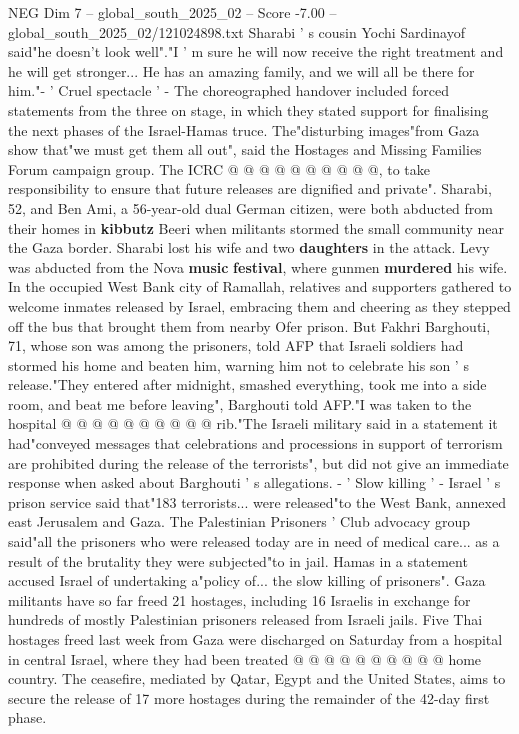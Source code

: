 \begin{textsample}{NEG Dim 7 – global\_south\_2025\_02 – Score -7.00 – global\_south\_2025\_02/121024898.txt}
Sharabi ' s cousin Yochi Sardinayof said"he doesn't look well"."I ' m sure he will now receive the right treatment and he will get stronger...
He has an amazing family, and we will all be there for him."- ' Cruel spectacle ' - The choreographed handover included forced statements from the three on stage, in which they stated support for finalising the next phases of the Israel-Hamas truce.
The"disturbing images"from Gaza show that"we must get them all out", said the Hostages and Missing Families Forum campaign group.
The ICRC @ @ @ @ @ @ @ @ @ @, to take responsibility to ensure that future releases are dignified and private".
Sharabi, 52, and Ben Ami, a 56-year-old dual German citizen, were both abducted from their homes in \textbf{kibbutz} Beeri when militants stormed the small community near the Gaza border.
Sharabi lost his wife and two \textbf{daughters} in the attack.
Levy was abducted from the Nova \textbf{music} \textbf{festival}, where gunmen \textbf{murdered} his wife.
In the occupied West Bank city of Ramallah, relatives and supporters gathered to welcome inmates released by Israel, embracing them and cheering as they stepped off the bus that brought them from nearby Ofer prison.
But Fakhri Barghouti, 71, whose son was among the prisoners, told AFP that Israeli soldiers had stormed his home and beaten him, warning him not to celebrate his son ' s release."They entered after midnight, smashed everything, took me into a side room, and beat me before leaving", Barghouti told AFP."I was taken to the hospital @ @ @ @ @ @ @ @ @ @ rib."The Israeli military said in a statement it had"conveyed messages that celebrations and processions in support of terrorism are prohibited during the release of the terrorists", but did not give an immediate response when asked about Barghouti ' s allegations. - ' Slow killing ' - Israel ' s prison service said that"183 terrorists... were released"to the West Bank, annexed east Jerusalem and Gaza.
The Palestinian Prisoners ' Club advocacy group said"all the prisoners who were released today are in need of medical care... as a result of the brutality they were subjected"to in jail.
Hamas in a statement accused Israel of undertaking a"policy of... the slow killing of prisoners".
Gaza militants have so far freed 21 hostages, including 16 Israelis in exchange for hundreds of mostly Palestinian prisoners released from Israeli jails.
Five Thai hostages freed last week from Gaza were discharged on Saturday from a hospital in central Israel, where they had been treated @ @ @ @ @ @ @ @ @ @ home country.
The ceasefire, mediated by Qatar, Egypt and the United States, aims to secure the release of 17 more hostages during the remainder of the 42-day first phase.

\end{textsample}
